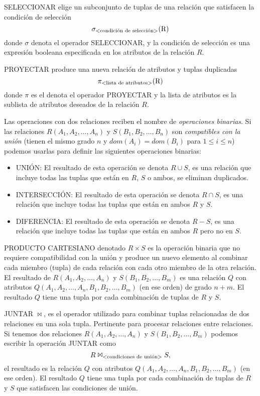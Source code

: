 SELECCIONAR elige un subconjunto de tuplas de una relación que satisfacen la condición de selección
\begin{equation}
\sigma_\text{\textless condición de selección\textgreater}{\text{(R)}}
\end{equation}
donde $\sigma$ denota el operador SELECCIONAR, y la condición de selección es una expresión booleana especificada en los atributos de la relación $R$.

PROYECTAR produce una nueva relación de atributos y tuplas duplicadas
\begin{equation}
\pi_\text{\textless lista de atributos\textgreater}{\text{(R)}}
\end{equation}
donde $\pi$ es el denota el operador PROYECTAR y la lista de atributos es la sublista de atributos deseados de la relación $R$.

Las operaciones con dos relaciones reciben el nombre de \emph{operaciones binarias}. Si las relaciones $R(A_1,A_2,\ldots,A_n)$ y $S(B_1,B_2,\ldots,B_n)$ son \emph{compatibles con la unión} (tienen el mismo grado $n$ y $dom(A_i)=dom(B_i)$ para $1\leq i\leq n$) podemos usarlas para definir las siguientes operaciones binarias:
\begin{itemize}
	\item UNIÓN: El resultado de esta operación se denota $R \cup S$, es una relación que incluye todas las tuplas que están en $R$, $S$ o ambos, se eliminan duplicados.
	\item INTERSECCIÓN: El resultado de esta operación se denota $R \cap S$, es una relación que incluye todas las tuplas que están en ambos $R$ y $S$.
	\item DIFERENCIA: El resultado de esta operación se denota $R - S$, es una relación que incluye todas las tuplas que están en ambos $R$ pero no en $S$.
\end{itemize}

PRODUCTO CARTESIANO denotado $R \times S$ es la operación binaria que no requiere compatibilidad con la unión y produce un nuevo elemento al combinar cada miembro (tupla) de cada relación con cada otro miembro de la otra relación. El resultado de $R(A_1,A_2,\ldots,A_n)$ y $S(B_1,B_2,\ldots,B_m)$ es una relación $Q$ con atributos $Q(A_1,A_2,\ldots,A_n,B_1,B_2,\ldots,B_m)$ (en ese orden) de grado $n+m$. El resultado $Q$ tiene una tupla por cada combinación de tuplas de $R$ y $S$.

JUNTAR $\Join$, es el operador utilizado para combinar tuplas relacionadas de dos relaciones en una sola tupla. Pertinente para procesar relaciones entre relaciones. Si tenemos dos relaciones $R(A_1,A_2,\ldots,A_n)$ y $S(B_1,B_2,\ldots,B_m)$ podemos escribir la operación JUNTAR como
\begin{equation}
R\Join_\text{\textless condiciones de unión\textgreater}S,
\end{equation}
el resultado es la relación $Q$ con atributos $Q(A_1,A_2,\ldots,A_n,B_1,B_2,\ldots,B_m)$ (en ese orden). El resultado $Q$ tiene una tupla por cada combinación de tuplas de $R$ y $S$ que satisfacen las condiciones de unión.\\
